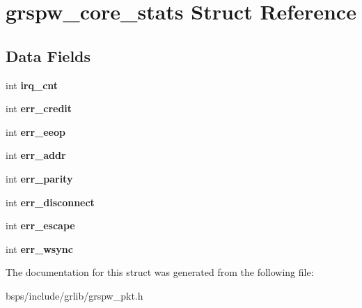 \hypertarget{structgrspw__core__stats}{}\section{grspw\+\_\+core\+\_\+stats Struct Reference}
\label{structgrspw__core__stats}
\subsection*{Data Fields}
\begin{DoxyCompactItemize}
\item 
\mbox{\label{structgrspw__core__stats_a1fc69aae1274cebd7032aa4d48b12892}} 
int {\bfseries irq\+\_\+cnt}
\item 
\mbox{\label{structgrspw__core__stats_a51b81428761aefba48f4e6550d30a382}} 
int {\bfseries err\+\_\+credit}
\item 
\mbox{\label{structgrspw__core__stats_a2475bb8fb7e6fb46adaf8082cf69f7b7}} 
int {\bfseries err\+\_\+eeop}
\item 
\mbox{\label{structgrspw__core__stats_a0bafe462eb49b8711cc3f3d13d03d363}} 
int {\bfseries err\+\_\+addr}
\item 
\mbox{\label{structgrspw__core__stats_aade6e790b663550a66a9883ea3548b58}} 
int {\bfseries err\+\_\+parity}
\item 
\mbox{\label{structgrspw__core__stats_ac3506952258d8b3f4e102c75cd34bf7f}} 
int {\bfseries err\+\_\+disconnect}
\item 
\mbox{\label{structgrspw__core__stats_ad27a1ebf336deda0199d0d78aa0cfe2f}} 
int {\bfseries err\+\_\+escape}
\item 
\mbox{\label{structgrspw__core__stats_a2f662231c38137a45e26f8a58db4906f}} 
int {\bfseries err\+\_\+wsync}
\end{DoxyCompactItemize}


The documentation for this struct was generated from the following file\+:\begin{DoxyCompactItemize}
\item 
bsps/include/grlib/grspw\+\_\+pkt.\+h\end{DoxyCompactItemize}

